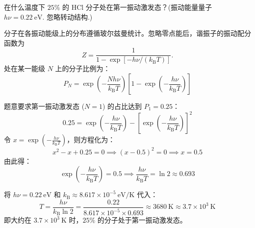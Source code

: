 \begin{exercise}\label{ex:26.9}
在什么温度下 $25\%$ 的 $\mathrm{HCl}$ 分子处在第一振动激发态？(振动能量量子 $h\nu = 0.22 \ \mathrm{eV}$. 忽略转动结构.)
\end{exercise}
\begin{solution}
分子在各振动能级上的分布遵循玻尔兹曼统计。忽略零点能后，谐振子的振动配分函数为
\[
Z=\frac{1}{1-\exp[-h\nu/(k_{\mathrm B}T)]}.
\]
处在某一能级 $N$ 上的分子比例为：
$$ P_N = \exp\left( - \frac{N h\nu}{k_{\mathrm{B}} T} \right) \left[ 1 - \exp\left( - \frac{h\nu}{k_{\mathrm{B}} T} \right) \right] $$

题意要求第一振动激发态 ($N=1$) 的占比达到 $P_1 = 0.25$：
$$ 0.25 = \exp\left( - \frac{h\nu}{k_{\mathrm{B}} T} \right) - \left[ \exp\left( - \frac{h\nu}{k_{\mathrm{B}} T} \right) \right]^2 $$
令 $x = \exp\left( - \frac{h\nu}{k_{\mathrm{B}} T} \right)$，则方程化为：
$$ x^2 - x + 0.25 = 0 \implies (x - 0.5)^2 = 0 \implies x = 0.5 $$
由此得：
$$ \exp\left( - \frac{h\nu}{k_{\mathrm{B}} T} \right) = 0.5 \implies \frac{h\nu}{k_{\mathrm{B}} T} = \ln 2 \approx 0.693 $$

将 $h\nu = 0.22 \ \mathrm{eV}$ 和 $k_{\mathrm{B}} \approx 8.617 \times 10^{-5} \ \mathrm{eV/K}$ 代入：
$$ T = \frac{h\nu}{k_{\mathrm{B}} \ln 2} = \frac{0.22}{8.617 \times 10^{-5} \times 0.693} \approx 3680 \ \mathrm{K} \approx 3.7 \times 10^3 \ \mathrm{K} $$
即大约在 $3.7 \times 10^3 \ \mathrm{K}$ 时，$25\%$ 的分子处于第一振动激发态。
\end{solution}

